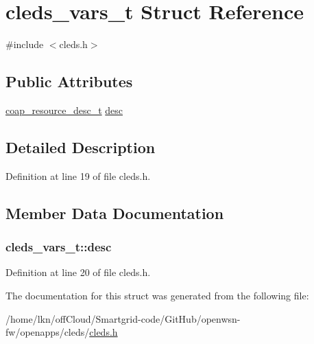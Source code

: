 \hypertarget{structcleds__vars__t}{}\section{cleds\+\_\+vars\+\_\+t Struct Reference}
\label{structcleds__vars__t}


{\ttfamily \#include $<$cleds.\+h$>$}

\subsection*{Public Attributes}
\begin{DoxyCompactItemize}
\item 
\hyperlink{structcoap__resource__desc__t}{coap\+\_\+resource\+\_\+desc\+\_\+t} \hyperlink{structcleds__vars__t_af0c0c58ee87feda3c04a6f6952912fcc}{desc}
\end{DoxyCompactItemize}


\subsection{Detailed Description}


Definition at line 19 of file cleds.\+h.



\subsection{Member Data Documentation}
\subsubsection[{\texorpdfstring{desc}{desc}}]{ cleds\+\_\+vars\+\_\+t\+::desc}\hypertarget{structcleds__vars__t_af0c0c58ee87feda3c04a6f6952912fcc}{}\label{structcleds__vars__t_af0c0c58ee87feda3c04a6f6952912fcc}


Definition at line 20 of file cleds.\+h.



The documentation for this struct was generated from the following file\+:\begin{DoxyCompactItemize}
\item 
/home/lkn/off\+Cloud/\+Smartgrid-\/code/\+Git\+Hub/openwsn-\/fw/openapps/cleds/\hyperlink{cleds_8h}{cleds.\+h}\end{DoxyCompactItemize}
